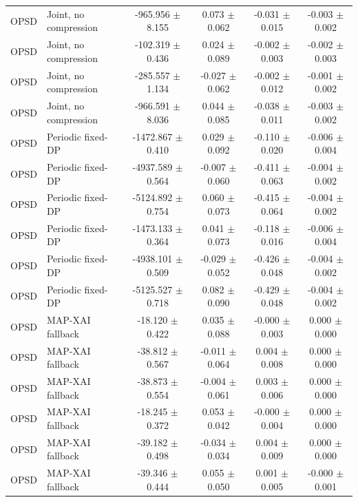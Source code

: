 \begin{table}[t]
\begin{tabular}{llcccc}
OPSD & Joint, no compression & -965.956 $\pm$ 8.155 & 0.073 $\pm$ 0.062 & -0.031 $\pm$ 0.015 & -0.003 $\pm$ 0.002 \\
OPSD & Joint, no compression & -102.319 $\pm$ 0.436 & 0.024 $\pm$ 0.089 & -0.002 $\pm$ 0.003 & -0.002 $\pm$ 0.003 \\
OPSD & Joint, no compression & -285.557 $\pm$ 1.134 & -0.027 $\pm$ 0.062 & -0.002 $\pm$ 0.012 & -0.001 $\pm$ 0.002 \\
OPSD & Joint, no compression & -966.591 $\pm$ 8.036 & 0.044 $\pm$ 0.085 & -0.038 $\pm$ 0.011 & -0.003 $\pm$ 0.002 \\
OPSD & Periodic fixed-DP & -1472.867 $\pm$ 0.410 & 0.029 $\pm$ 0.092 & -0.110 $\pm$ 0.020 & -0.006 $\pm$ 0.004 \\
OPSD & Periodic fixed-DP & -4937.589 $\pm$ 0.564 & -0.007 $\pm$ 0.060 & -0.411 $\pm$ 0.063 & -0.004 $\pm$ 0.002 \\
OPSD & Periodic fixed-DP & -5124.892 $\pm$ 0.754 & 0.060 $\pm$ 0.073 & -0.415 $\pm$ 0.064 & -0.004 $\pm$ 0.002 \\
OPSD & Periodic fixed-DP & -1473.133 $\pm$ 0.364 & 0.041 $\pm$ 0.073 & -0.118 $\pm$ 0.016 & -0.006 $\pm$ 0.004 \\
OPSD & Periodic fixed-DP & -4938.101 $\pm$ 0.509 & -0.029 $\pm$ 0.052 & -0.426 $\pm$ 0.048 & -0.004 $\pm$ 0.002 \\
OPSD & Periodic fixed-DP & -5125.527 $\pm$ 0.718 & 0.082 $\pm$ 0.090 & -0.429 $\pm$ 0.048 & -0.004 $\pm$ 0.002 \\
OPSD & MAP-XAI fallback & -18.120 $\pm$ 0.422 & 0.035 $\pm$ 0.088 & -0.000 $\pm$ 0.003 & 0.000 $\pm$ 0.000 \\
OPSD & MAP-XAI fallback & -38.812 $\pm$ 0.567 & -0.011 $\pm$ 0.064 & 0.004 $\pm$ 0.008 & 0.000 $\pm$ 0.000 \\
OPSD & MAP-XAI fallback & -38.873 $\pm$ 0.554 & -0.004 $\pm$ 0.061 & 0.003 $\pm$ 0.006 & 0.000 $\pm$ 0.000 \\
OPSD & MAP-XAI fallback & -18.245 $\pm$ 0.372 & 0.053 $\pm$ 0.042 & -0.000 $\pm$ 0.004 & 0.000 $\pm$ 0.000 \\
OPSD & MAP-XAI fallback & -39.182 $\pm$ 0.498 & -0.034 $\pm$ 0.034 & 0.004 $\pm$ 0.009 & 0.000 $\pm$ 0.000 \\
OPSD & MAP-XAI fallback & -39.346 $\pm$ 0.444 & 0.055 $\pm$ 0.050 & 0.001 $\pm$ 0.005 & -0.000 $\pm$ 0.001 \\
\bottomrule
\end{tabular}
\end{table}
